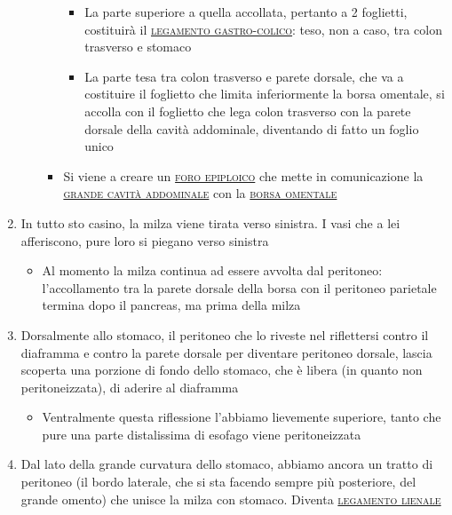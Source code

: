 \documentclass[italian,]{article}
\providecommand{\tightlist}{%
  \setlength{\itemsep}{0pt}\setlength{\parskip}{0pt}}
\renewcommand{\a}[1]{\underline{\textsc{#1}}}
\begin{document}
\begin{enumerate}
\begin{itemize}
\begin{itemize}
      \begin{itemize}
      \tightlist
      \item
        La parte superiore a quella accollata, pertanto a 2 foglietti,
        costituirà il \a{legamento gastro-colico}: teso, non a caso, tra
        colon trasverso e stomaco
      \item
        La parte tesa tra colon trasverso e parete dorsale, che va a
        costituire il foglietto che limita inferiormente la borsa
        omentale, si accolla con il foglietto che lega colon trasverso
        con la parete dorsale della cavità addominale, diventando di
        fatto un foglio unico
      \end{itemize}
    \item
      Si viene a creare un \a{foro epiploico} che mette in comunicazione
      la \a{grande cavità addominale} con la \a{borsa omentale}
    \end{itemize}
  \end{itemize}
\item
  In tutto sto casino, la milza viene tirata verso sinistra. I vasi che
  a lei afferiscono, pure loro si piegano verso sinistra

  \begin{itemize}
  \tightlist
  \item
    Al momento la milza continua ad essere avvolta dal peritoneo:
    l'accollamento tra la parete dorsale della borsa con il peritoneo
    parietale termina dopo il pancreas, ma prima della milza
  \end{itemize}
\item
  Dorsalmente allo stomaco, il peritoneo che lo riveste nel riflettersi
  contro il diaframma e contro la parete dorsale per diventare peritoneo
  dorsale, lascia scoperta una porzione di fondo dello stomaco, che è
  libera (in quanto non peritoneizzata), di aderire al diaframma

  \begin{itemize}
  \tightlist
  \item
    Ventralmente questa riflessione l'abbiamo lievemente superiore,
    tanto che pure una parte distalissima di esofago viene
    peritoneizzata
  \end{itemize}
\item
  Dal lato della grande curvatura dello stomaco, abbiamo ancora un
  tratto di peritoneo (il bordo laterale, che si sta facendo sempre più
  posteriore, del grande omento) che unisce la milza con stomaco.
  Diventa \a{legamento lienale}
\end{enumerate}
\end{document}
